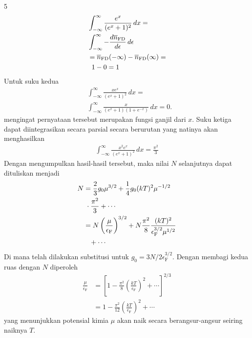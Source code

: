 \documentclass[a4paper  , 6 pt]{article}
\begin{document}
\begin{tiny}
\begin{multicols} {5}
\begin{align}
&\int_{- \infty}^{\infty} \frac{e^x}{(e^x + 1)^2} \, dx  = 
\nonumber \\
& \int_{- \infty}^{\infty} - \frac{d \overline{n}_\mathrm{FD}}{d \epsilon} \, d\epsilon \nonumber \\
& = \overline{n}_\mathrm{FD} (- \infty) - \overline{ n}_\mathrm{FD} (\infty)  =\nonumber \\
& \hspace{0.2 cm } 1- 0 =1
 \end{align}
 Untuk suku kedua 
 \begin{align}
& \int_{-\infty}^{\infty} \frac{x e^x }{(e^x + 1)^2}  \, dx =   \nonumber \\
 & \int_{-\infty}^{\infty} \frac{x}{(e^x + 1)(1+ e^{-x})} \, dx  = 0. 
 \end{align}
 mengingat pernyataan tersebut merupakan fungsi ganjil dari $x$. \newline
 Suku ketiga dapat diintegrasikan secara parsial secara berurutan yang natinya akan menghasilkan 
 \begin{align}
 \int_{- \infty}^{\infty} \frac{x^2 e^x }{(e^x +1)^2 } \,  dx = \frac{\pi^2}{3} 
 \end{align}
 Dengan mengumpulkan hasil-hasil tersebut, maka nilai $N$ selanjutnya dapat dituliskan menjadi
 \begin{align}
 N & = \frac{2}{3} g_0 \mu^{3/2} + \frac{1}{4} g_0 (kT)^2 \mu^{-1/2}\nonumber \\
 & \hspace{0.1 cm }  \cdot \frac{\pi^2} {3} + \cdots \nonumber \\
 & = N \left(\frac{\mu}{\epsilon_\mathrm{F}}\right)^{3/2 } + N \frac{\pi^2}{8} \frac{(kT) ^2}{\epsilon_\mathrm{F}^{3/2} \mu^{1/2}} \nonumber \\
 & \hspace{0.3 cm } + \cdots
 \end{align}
 Di mana telah dilakukan substitusi untuk $g_0  = 3N / 2 \epsilon_\mathrm{F}^{3/2}$. Dengan membagi kedua ruas dengan $N$ diperoleh
 \begin{align}
 \frac{\mu}{\epsilon_\mathrm{F}}  &=  \left [  1 -  \frac{\pi^2}{8} \left(\frac{kT}{\epsilon_\mathrm{F}}\right)^2 + \cdots\right]^{2/3} \nonumber \\
 & = 1- \frac{\pi^2}{12} \left(\frac{kT}{\epsilon_\mathrm{F}}\right)^2  + \cdots \label{potensial kimia}
 \end{align} 
 yang menunjukkan  potensial kimia $\mu$ akan naik secara berangsur-angsur seiring naiknya $T$. \newline

\end{multicols}
\end{tiny}
\end{document}
